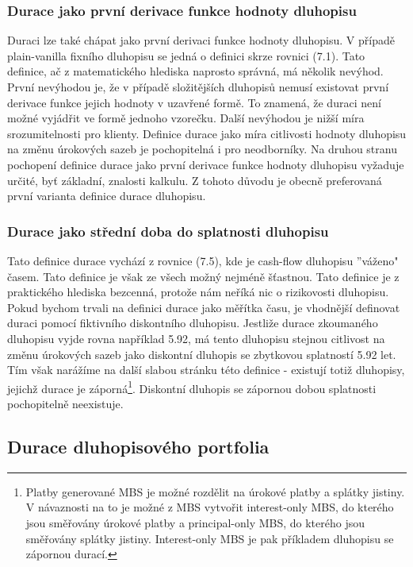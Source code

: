 \documentclass[a4paper]{book}
\begin{document}
\subsubsection{Durace jako první derivace funkce hodnoty dluhopisu}

Duraci lze také chápat jako první derivaci funkce hodnoty dluhopisu. V případě plain-vanilla fixního dluhopisu se jedná o definici skrze rovnici (7.1). Tato definice, ač z matematického hlediska naprosto správná, má několik nevýhod. První nevýhodou je, že v případě složitějších dluhopisů nemusí existovat první derivace funkce jejich hodnoty v uzavřené formě. To znamená, že duraci není možné vyjádřit ve formě jednoho vzorečku. Další nevýhodou je nižší míra srozumitelnosti pro klienty. Definice durace jako míra citlivosti hodnoty dluhopisu na změnu úrokových sazeb je pochopitelná i pro neodborníky. Na druhou stranu pochopení definice durace jako první derivace funkce hodnoty dluhopisu vyžaduje určité, byť základní, znalosti kalkulu. Z tohoto důvodu je obecně preferovaná první varianta definice durace dluhopisu. 

\subsubsection{Durace jako střední doba do splatnosti dluhopisu}

Tato definice durace vychází z rovnice (7.5), kde je cash-flow dluhopisu ''váženo" časem. Tato definice je však ze všech možný nejméně šťastnou. Tato definice je z praktického hlediska bezcenná, protože nám neříká nic o rizikovosti dluhopisu. Pokud bychom trvali na definici durace jako měřítka času, je vhodnější definovat duraci pomocí fiktivního diskontního dluhopisu. Jestliže durace zkoumaného dluhopisu vyjde rovna například 5.92, má tento dluhopisu stejnou citlivost na změnu úrokových sazeb jako diskontní dluhopis se zbytkovou splatností 5.92 let. Tím však narážíme na další slabou stránku této definice - existují totiž dluhopisy, jejichž durace je záporná\footnote{Platby generované MBS je možné rozdělit na úrokové platby a splátky jistiny. V návaznosti na to je možné z MBS vytvořit interest-only MBS, do kterého jsou směřovány úrokové platby a principal-only MBS, do kterého jsou směřovány splátky jistiny. Interest-only MBS je pak příkladem dluhopisu se zápornou durací.}. Diskontní dluhopis se zápornou dobou splatnosti pochopitelně neexistuje.

\subsection{Durace dluhopisového portfolia}
\end{document}
